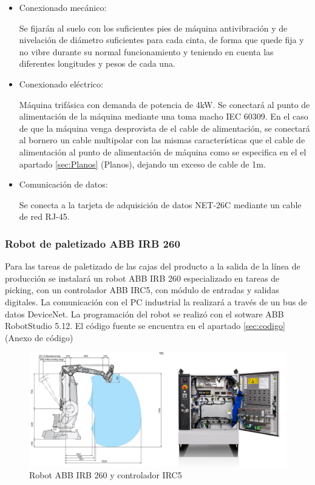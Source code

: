 		\begin{itemize}
				\item{Conexionado mecánico:}
				
				Se fijarán al suelo con los suficientes pies de máquina antivibración y de nivelación de diámetro suficientes para cada cinta, de forma que quede fija y no vibre durante su normal funcionamiento y teniendo en cuenta las diferentes longitudes y pesos de cada una.

				\item{Conexionado eléctrico:}

				Máquina trifásica con demanda de potencia de 4kW. Se conectará al punto de alimentación de la máquina mediante una  toma macho IEC 60309. En el caso de que la máquina venga desprovista de el cable de alimentación, se conectará al bornero un cable multipolar con las mismas características que el cable de alimentación al punto de alimentación de máquina como se especifica en el el apartado \ref{sec:Planos} (Planos), dejando un exceso de cable de 1m. \ 
				
				\item{Comunicación de datos:}

				Se conecta a la tarjeta de adquisición de datos NET-26C mediante un cable de red RJ-45.
		\end{itemize}


\newpage

\subsubsection{Robot de paletizado ABB IRB 260}

	
	
	Para las tareas de paletizado de las cajas del producto a la salida de la línea de producción se instalará un robot ABB IRB 260 especializado en tareas de picking, con un controlador ABB IRC5, con módulo de entradas y salidas digitales. La comunicación con el PC industrial la realizará a través de un bus de datos DeviceNet. La programación del robot se realizó con el sotware ABB RobotStudio 5.12. El código fuente se encuentra en el apartado \ref{sec:codigo} (Anexo de código)\\
	
	\begin{figure}[htp]
		
			\centering
			\includegraphics[scale=0.3]{Datasheets/8Foto.jpg}
			\caption{Robot ABB IRB 260 y controlador IRC5}
			\label{fig:testa}
		
	\end{figure}

